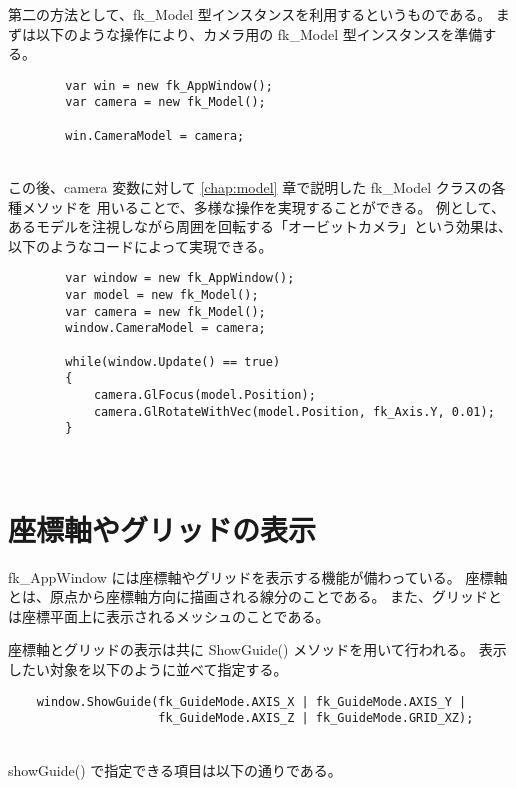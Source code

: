 第二の方法として、fk\_Model 型インスタンスを利用するというものである。
まずは以下のような操作により、カメラ用の fk\_Model 型インスタンスを準備する。
\\
\begin{breakbox}
\begin{verbatim}
        var win = new fk_AppWindow();
        var camera = new fk_Model();

        win.CameraModel = camera;
\end{verbatim}
\end{breakbox}
~ \\
この後、camera 変数に対して \ref{chap:model} 章で説明した fk\_Model クラスの各種メソッドを
用いることで、多様な操作を実現することができる。
例として、あるモデルを注視しながら周囲を回転する「オービットカメラ」という効果は、
以下のようなコードによって実現できる。
\\
\begin{breakbox}
\begin{verbatim}
        var window = new fk_AppWindow();
        var model = new fk_Model();
        var camera = new fk_Model();
        window.CameraModel = camera;

        while(window.Update() == true)
        {
            camera.GlFocus(model.Position);
            camera.GlRotateWithVec(model.Position, fk_Axis.Y, 0.01);
        }
\end{verbatim}
\end{breakbox}
~ \\

\section{座標軸やグリッドの表示}
fk\_AppWindow には座標軸やグリッドを表示する機能が備わっている。
座標軸とは、原点から座標軸方向に描画される線分のことである。
また、グリッドとは座標平面上に表示されるメッシュのことである。

座標軸とグリッドの表示は共に ShowGuide() メソッドを用いて行われる。
表示したい対象を以下のように並べて指定する。
\\
\begin{screen}
\begin{verbatim}
    window.ShowGuide(fk_GuideMode.AXIS_X | fk_GuideMode.AXIS_Y |
                     fk_GuideMode.AXIS_Z | fk_GuideMode.GRID_XZ);
\end{verbatim}
\end{screen}
~ \\
showGuide() で指定できる項目は以下の通りである。

